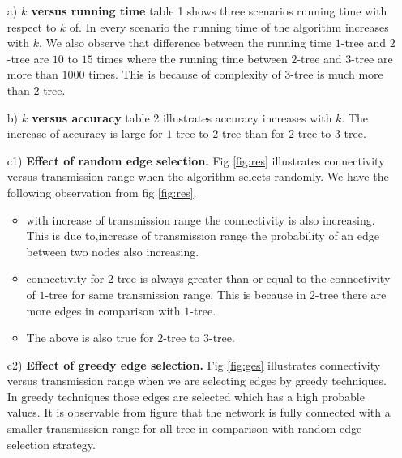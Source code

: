\documentclass[11pt]{article}
\begin{document}
\begin{itemize}
\item[a)] \textbf{$k$ versus running time} table 1 shows three scenarios running time with respect to $k$ of. In every scenario the running time of the algorithm increases with $k$. We also observe that difference between the running time $1$-tree and $2$-tree are $10$ to $15$ times where the running time between $2$-tree and $3$-tree are more than $1000$ times. This is because of complexity of $3$-tree is much more than $2$-tree.\\
\item [b)]\textbf{$k$ versus accuracy}
table 2 illustrates accuracy increases with $k$. The increase of accuracy is large for $1$-tree to $2$-tree than for $2$-tree to $3$-tree. 

\item [c1)] \textbf{Effect of random edge selection.} Fig \ref{fig:res} illustrates connectivity versus transmission range when the algorithm selects randomly. We have the following observation from fig \ref{fig:res}.

 
\begin{itemize}[noitemsep,nolistsep]
\item with increase of transmission range the connectivity is also increasing. This is due to,increase of transmission range the probability of an edge between two nodes also increasing.
\item connectivity for $2$-tree is always greater than or equal to the connectivity of $1$-tree for same transmission range. This is because in $2$-tree there are more edges in comparison with $1$-tree.
\item The above is also true for $2$-tree to $3$-tree.
\end{itemize}
\item [c2)]\textbf{Effect of greedy edge selection.} Fig \ref{fig:ges} illustrates connectivity versus transmission range when we are selecting edges by greedy techniques. In greedy techniques those edges are selected which has a high probable values. It is observable from figure that the network is fully connected with a smaller transmission range for all tree in comparison with random edge selection strategy.
\end{itemize}
\end{document}

